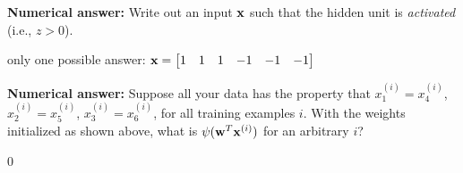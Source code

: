 \begin{parts}
\begin{minipage}{0.7\linewidth}
\begin{center}
    
\end{center}
\end{minipage}


\begin{subparts}
\subpart[2] \textbf{Numerical answer:} Write out an input $\mathbf{x}$ such that the hidden unit is \emph{activated} (i.e., $z > 0$).

\begin{tcolorbox}[fit,height=1.5cm, width=15cm, blank, borderline={1pt}{-2pt}]
\end{tcolorbox}
\begin{soln}
    only one possible answer: 
   $\mathbf{x} = \begin{bmatrix}1 & 1 & 1 & -1 & -1 & -1\end{bmatrix}$ 
\end{soln} 


\subpart[1] \textbf{Numerical answer:} Suppose all your data has the property that $x_1^{(i)} = x_4^{(i)}$, $x_2^{(i)} = x_5^{(i)}$, $x_3^{(i)} = x_6^{(i)}$, for all training examples $i$. With the weights initialized as shown above, what is $\psi(\mathbf{w}^T \mathbf{x}^{(i)})$ for an arbitrary $i$?
\begin{tcolorbox}[fit,height=1.5cm, width=4cm, blank, borderline={1pt}{-2pt}]
\end{tcolorbox}
    \begin{soln}
    0
    \end{soln} 


\end{subparts}
\end{parts}
